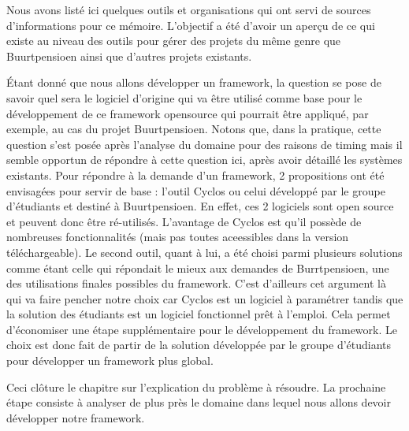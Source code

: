 Nous avons listé ici quelques outils et organisations qui ont servi de sources d'informations pour ce mémoire.  L'objectif a été d'avoir un aperçu de ce qui existe au niveau des outils pour gérer des projets du même genre que Buurtpensioen ainsi que d'autres projets existants.  

Étant donné que nous allons développer un framework,  la question se pose de savoir quel sera le logiciel d'origine qui va être utilisé comme base pour le développement de ce framework opensource qui pourrait être appliqué,  par exemple,  au cas du projet Buurtpensioen.  Notons que,  dans la pratique,  cette question s'est posée après l'analyse du domaine pour des raisons de timing mais il semble opportun de répondre à cette question ici,  après avoir détaillé les systèmes existants.  
Pour répondre à la demande d'un framework,  2 propositions ont été envisagées pour servir de base : l'outil Cyclos ou celui développé par le groupe d'étudiants et destiné à Buurtpensioen.   En effet,  ces 2 logiciels sont open source et peuvent donc être ré-utilisés.  L'avantage de Cyclos est qu'il possède de nombreuses fonctionnalités (mais pas toutes aceessibles dans la version téléchargeable).  Le second outil,  quant à lui,  a été choisi parmi plusieurs solutions comme étant celle qui répondait le mieux aux demandes de Burrtpensioen,  une des utilisations finales possibles du framework.  C'est d'ailleurs cet argument là qui va faire pencher notre choix car Cyclos est un logiciel à paramétrer tandis que la solution des étudiants est un logiciel fonctionnel prêt à l'emploi.  Cela permet d'économiser une étape supplémentaire pour le développement du framework.  Le choix est donc fait de partir de la solution développée par le groupe d'étudiants pour développer un framework plus global.

Ceci clôture le chapitre sur l'explication du problème à résoudre.  La prochaine étape consiste à analyser de plus près le domaine dans lequel nous allons devoir développer notre framework.  


